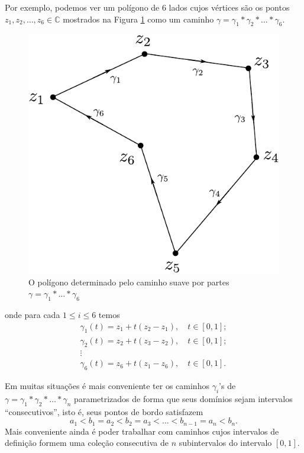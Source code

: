 Por exemplo, podemos ver um polígono de 6 lados cujos vértices são os 
pontos $z_1,z_2,\ldots, z_6\in\mathbb{C}$ mostrados na Figura \ref{fig-polig-6-lados}
como um caminho $\gamma = \gamma_1*\gamma_2*\ldots*\gamma_6$.

\begin{figure}[H]
\centering
\includegraphics[scale=0.6]{Figuras/fig-polig-6-lados}
\caption{O polígono determinado pelo caminho suave por partes $\gamma= \gamma_1*\ldots*\gamma_6$}
\label{fig-polig-6-lados}
\end{figure}


onde para cada $1\leqslant i\leqslant 6$ temos 
\begin{align*}
\gamma_1(t) = z_1+t(z_2-z_1), \quad t\in [0,1];\\
\gamma_2(t) = z_2+t(z_3-z_2), \quad t\in [0,1];\\
\vdots\qquad \qquad\qquad \qquad \\
\gamma_6(t) = z_6+t(z_1-z_6), \quad t\in[0,1].
\end{align*}

\bigskip 





Em muitas situações é mais conveniente ter os caminhos $\gamma_i$'s de 
$\gamma=\gamma_1*\gamma_2*\ldots*\gamma_n$
parametrizados de forma que seus domínios sejam intervalos ``consecutivos'', isto é, seus pontos
de bordo satisfazem 
\[
a_1<b_1=a_2<b_2=a_3<\ldots<b_{n-1}=a_{n}<b_n.
\]
Mais conveniente ainda é poder trabalhar com caminhos cujos intervalos de definição 
formem uma coleção consecutiva de $n$ subintervalos do intervalo $[0,1]$. 

